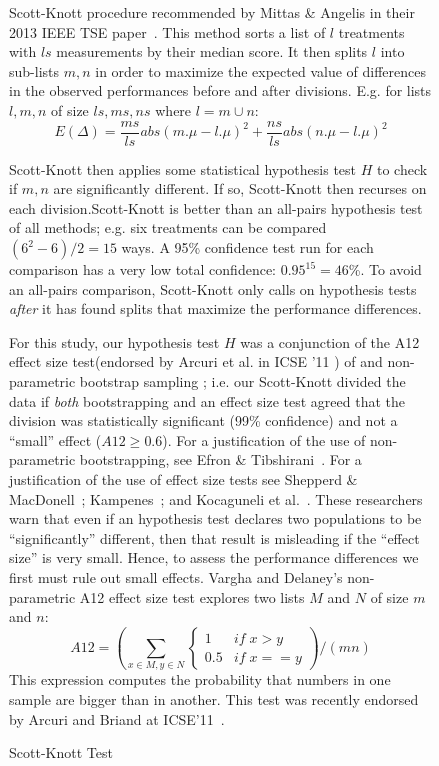 \documentclass[final,twocolumn]{elsarticle}
\renewcommand{\footnotesize}{\scriptsize}
\theoremstyle{break}
\begin{document}
\begin{figure}[!ht]
    \centering\footnotesize
    \begin{minipage}[c]{\linewidth}
    \begin{mdframed}
    Scott-Knott procedure recommended by Mittas \& Angelis in their 2013 IEEE TSE paper~\cite{mittas13}.  This method sorts a list of $l$ treatments with $ls$ measurements by their median score. It then splits $l$ into sub-lists $m,n$ in order to maximize the expected value of differences  in the observed performances before and after divisions. E.g. for lists $l,m,n$ of size $ls,ms,ns$ where $l=m\cup n$:
     \[E(\Delta)=\frac{ms}{ls}abs(m.\mu - l.\mu)^2 + \frac{ns}{ls}abs(n.\mu - l.\mu)^2\]

    Scott-Knott then applies some statistical hypothesis test $H$ to check if $m,n$ are significantly different. If so, Scott-Knott then recurses on each division.Scott-Knott is better than an all-pairs hypothesis test of all methods; e.g. six treatments can be compared \mbox{$(6^2-6)/2=15$} ways.  A 95\% confidence test run for each comparison has  a very low total confidence: \mbox{$0.95^{15} = 46$}\%. To avoid an all-pairs comparison, Scott-Knott only calls on hypothesis tests {\em after} it has found splits that maximize the performance differences.

    For this study, our hypothesis test $H$ was a conjunction of the A12 effect size test(endorsed by Arcuri et al. in ICSE '11 \cite{arcuri11}) of  and non-parametric bootstrap sampling \cite{efron93}; i.e. our Scott-Knott divided the data if {\em both}
    bootstrapping and an effect size test agreed that the division was statistically significant (99\% confidence) and not a ``small'' effect ($A12 \ge 0.6$). 
    For a justification of the use of non-parametric
    bootstrapping, see Efron \&
    Tibshirani~\cite[p220-223]{efron93}.
    For a justification of the use of effect size tests
    see Shepperd \& MacDonell~\cite{shepperd12a}; Kampenes~\cite{kampenes07}; and
    Kocaguneli et al.~\cite{kocharm13}. These researchers
    warn that even if an
    hypothesis test declares two populations to be
    ``significantly'' different, then that result is
    misleading if the ``effect size'' is very small.
    Hence, to assess 
    the performance differences 
    we first must rule out small effects.
    Vargha and Delaney's
    non-parametric 
    A12 effect size test 
    explores
    two lists $M$ and $N$ of size $m$ and $n$:
    \[A12 = \left(\sum_{x\in M, y \in N} 
    \begin{cases} 
    1   & \mathit{if}\; x > y\\
    0.5 & \mathit{if}\; x == y
    \end{cases}\right) / (mn)
    \]
    This expression computes the probability that numbers in one sample are bigger than in another.
    This test was recently 
    endorsed by Arcuri and Briand
    at ICSE'11~\cite{arcuri11}.
    \end{mdframed}
    \caption{Scott-Knott Test}
    \end{minipage}
    \label{fig:sk}
\end{figure}
\end{document}
